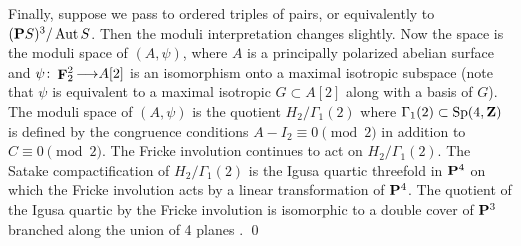 \documentclass[11pt,reqno]{amsart}
\theoremstyle{plain}
\theoremstyle{definition}
\theoremstyle{remark}
\numberwithin{equation}{section}
\DeclareMathOperator{\F}{\mathbf F}
\renewcommand{\to}{{\longrightarrow}}
\numberwithin{equation}{section}
\begin{document}
\begin{remark}
  Finally, suppose we pass to ordered triples of pairs, or equivalently to $(\P S)^3 / \Aut S$.
  Then the moduli interpretation changes slightly.
  Now the space is the moduli space of $(A, \psi)$, where $A$ is a principally polarized abelian surface and $\psi \from \F_2^2 \to A[2]$ is an isomorphism onto a maximal isotropic subspace (note that $\psi$ is equivalent to a maximal isotropic $G \subset A[2]$ along with a basis of $G$).
  The moduli space of $(A, \psi)$ is the quotient $H_2 / \Gamma_1(2)$ where $\Gamma_1(2) \subset \operatorname{Sp}(4, \Z)$ is defined by the congruence conditions $A - I_2 \equiv 0 \pmod 2$ in addition to $C \equiv 0 \pmod 2$.
  The Fricke involution continues to act on $H_2 / \Gamma_1(2)$.
  The Satake compactification of $H_2 / \Gamma_1(2)$ is the Igusa quartic threefold in $\P^4$ on which the Fricke involution acts by a linear transformation of $\P^4$.
  The quotient of the Igusa quartic by the Fricke involution is isomorphic to a double cover of $\P^3$ branched along the union of 4 planes  \cite[Theorem~2]{muk:12}.
  \qed
\end{remark}
\end{document}
